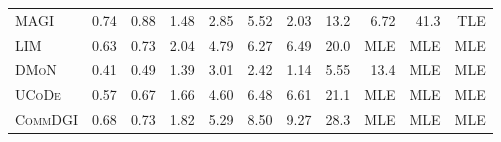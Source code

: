\documentclass[11pt,a4paper]{article}
\begin{document}
\begin{table}[H]
\begin{tabular*}{\textwidth}{@{\extracolsep{\fill}}l rrrrrrrrrr@{}}
        \textsc{MAGI}      & 0.74 & 0.88     & 1.48  & 2.85 & 5.52  & 2.03   & 13.2    & 6.72  & 41.3   & TLE  \\
        \textsc{LIM}       & 0.63 & 0.73     & 2.04  & 4.79 & 6.27  & 6.49   & 20.0    & MLE   & MLE    & MLE  \\
        \textsc{DMoN}      & 0.41 & 0.49     & 1.39  & 3.01 & 2.42  & 1.14   & 5.55    & 13.4  & MLE    & MLE  \\
        \textsc{UCoDe}     & 0.57 & 0.67     & 1.66  & 4.60 & 6.48  & 6.61   & 21.1    & MLE   & MLE    & MLE  \\
        \textsc{CommDGI}   & 0.68 & 0.73     & 1.82  & 5.29 & 8.50  & 9.27   & 28.3    & MLE   & MLE    & MLE  \\
        \bottomrule
    \end{tabular*}
\end{table}
\end{document}
